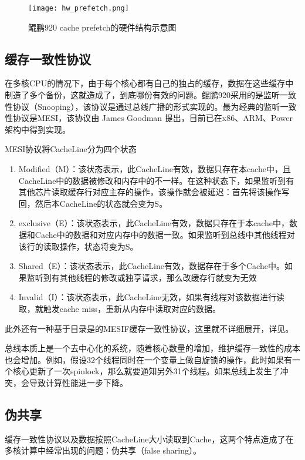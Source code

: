 \begin{figure}[htbp]
    \centering
    \texttt{[image: hw\_prefetch.png]}
    \caption{鲲鹏920 cache prefetch的硬件结构示意图}
    \label{hw_prefetch}
\end{figure}

\subsection{缓存一致性协议}

在多核CPU的情况下，由于每个核心都有自己的独占的缓存，数据在这些缓存中制造了多个备份，这就造成了，到底哪份有效的问题。鲲鹏920采用的是监听一致性协议（Snooping），该协议是通过总线广播的形式实现的。最为经典的监听一致性协议是MESI，该协议由 James Goodman 提出，目前已在x86、ARM、Power架构中得到实现。

MESI协议将CacheLine分为四个状态
\begin{enumerate} \setlength{\itemsep}{0pt}
\item Modified（M）：该状态表示，此CacheLine有效，数据只存在本cache中，且CacheLine中的数据被修改和内存中的不一样。在这种状态下，如果监听到有其他芯片读取缓存行对应主存的操作，该操作就会被延迟：首先将该操作写回，然后本CacheLine的状态就会变为S。
\item exclusive（E）：该状态表示，此CacheLine有效，数据只存在于本cache中，数据和Cache中的数据和对应内存中的数据一致。如果监听到总线中其他线程对该行的读取操作，状态将变为S。
\item Shared（E）：该状态表示，此CacheLine有效，数据存在于多个Cache中。如果监听到有其他线程的修改或独享请求，那么改缓存行就变为无效
\item Invalid（I）：该状态表示，此CacheLine无效，如果有线程对该数据进行读取，就触发cache miss，重新从内存中读取对应的数据。

\end{enumerate}
此外还有一种基于目录是的MESIF缓存一致性协议，这里就不详细展开，详见\cite{husengseng2017}。

总线本质上是一个去中心化的系统，随着核心数量的增加，维护缓存一致性的成本也会增加。例如，假设32个线程同时在一个变量上做自旋锁的操作，此时如果有一个核心更新了一次spinlock，那么就要通知另外31个线程。如果总线上发生了冲突，会导致计算性能进一步下降。

\subsection{伪共享}
缓存一致性协议以及数据按照CacheLine大小读取到Cache，这两个特点造成了在多核计算中经常出现的问题：伪共享（false sharing）。

